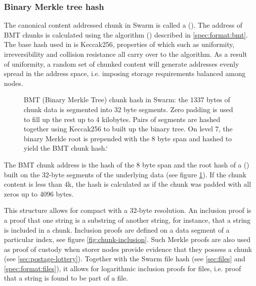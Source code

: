 \subsubsection{Binary Merkle tree hash}

The canonical content addressed chunk in Swarm is called a  ().
The address of BMT chunks is calculated using the  algorithm () described in \ref{spec:format:bmt}. The base hash used in  is Keccak256, properties of which such as uniformity, irreversibility and collision resistance all carry over to the  algorithm. As a result of uniformity, a random set of chunked content will generate addresses evenly spread in the address space, i.e. imposing storage requirements balanced among nodes.


\begin{figure}[htbp]
   \centering
   \resizebox{1\textwidth}{!}{
   }
   \caption[BMT: Binary Merkle Tree hash used as chunk hash in Swarm \statusgreen]{BMT (Binary Merkle Tree) chunk hash in Swarm: the 1337 bytes of chunk data is segmented into 32 byte segments. Zero padding is used to fill up the rest up to 4 kilobytes. Pairs of segments are hashed together using Keccak256 to built up the binary tree. On level 7, the binary Merkle root is prepended with the 8 byte span and hashed to yield the BMT chunk hash.`}
   \label{fig:BMT}
\end{figure}

The BMT chunk address is the hash of the 8 byte span and the root hash of a  () built on the 32-byte segments of the underlying data (see figure \ref{fig:BMT}). If the chunk content is less than 4k, the hash is calculated as if the chunk was padded with all zeros up to 4096 bytes.

This structure allows for compact  with a 32-byte resolution. An inclusion proof is a proof that one string is a substring of another string, for instance, that a string is included in a chunk. Inclusion proofs are defined on a data segment of a particular index, see figure \ref{fig:chunk-inclusion}. Such Merkle proofs are also used as proof of custody when storer nodes provide evidence that they possess a chunk (see \ref{sec:postage-lottery}). Together with the Swarm file hash (see \ref{sec:files} and \ref{spec:format:files}), it allows for logarithmic inclusion proofs for files, i.e. proof that a string is found to be part of a file.


